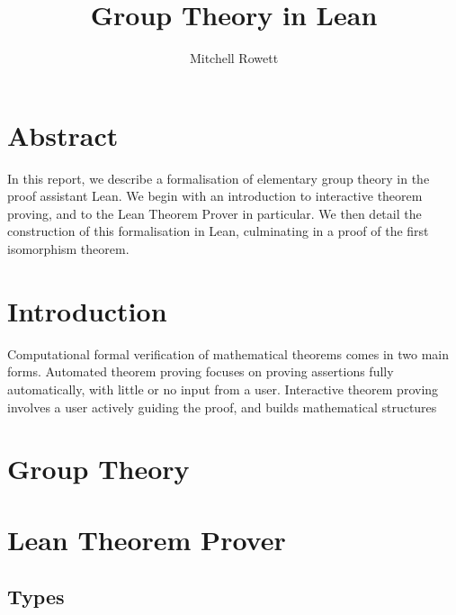 \documentclass[runningheads,a4paper]{llncs}
\renewcommand{\-}{\setminus}
\begin{document}
\mainmatter 

\title{Group Theory in Lean}


\author{Mitchell Rowett}



\tocauthor{{}}

\maketitle

\medskip

\begingroup
\let\clearpage\relax
\tableofcontents
\endgroup

\section*{Abstract}

In this report, we describe a formalisation of elementary group theory in the proof assistant Lean. We begin with an introduction to interactive theorem proving, and to the Lean Theorem Prover in particular. We then detail the construction of this formalisation in Lean, culminating in a proof of the first isomorphism theorem.

\section{Introduction}
Computational formal verification of mathematical theorems comes in two main forms. Automated theorem proving focuses on proving assertions fully automatically, with little or no input from a user. Interactive theorem proving involves a user actively guiding the proof, and builds mathematical structures 

\section{Group Theory}

\section{Lean Theorem Prover}

\subsection{Types}
\end{document}
